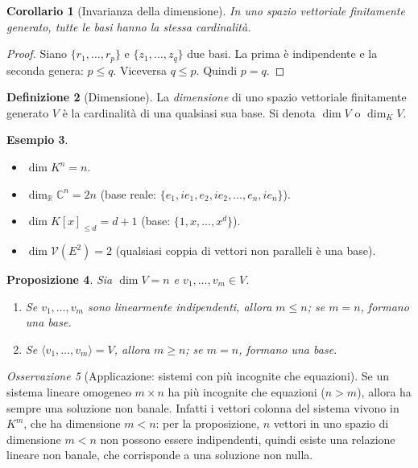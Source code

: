\documentclass[11pt, a4paper]{book}
\theoremstyle{definition}
\newtheorem{definizione}{Definizione}[section]
\newtheorem{esempio}[definizione]{Esempio}
\theoremstyle{plain}
\newtheorem{proposizione}[definizione]{Proposizione}
\newtheorem{corollario}[definizione]{Corollario}
\theoremstyle{remark}
\newtheorem{osservazione}[definizione]{Osservazione}
\newcommand{\R}{\mathbb{R}}
\newcommand{\C}{\mathbb{C}}
\begin{document}
\begin{corollario}[Invarianza della dimensione]
In uno spazio vettoriale finitamente generato, tutte le basi hanno la stessa cardinalità.
\end{corollario}

\begin{proof}
Siano $\{r_1,\ldots,r_p\}$ e $\{z_1,\ldots,z_q\}$ due basi. La prima è indipendente e la seconda genera: $p \leq q$. Viceversa $q \leq p$. Quindi $p = q$.
\end{proof}

\begin{defbox}
\begin{definizione}[Dimensione]
La \emph{dimensione} di uno spazio vettoriale finitamente generato $V$ è la cardinalità di una qualsiasi sua base. Si denota $\dim V$ o $\dim_K V$.
\end{definizione}
\end{defbox}

\begin{exbox}
\begin{esempio}
\begin{itemize}
  \item $\dim K^n = n$.
  \item $\dim_\R \C^n = 2n$ (base reale: $\{e_1, ie_1, e_2, ie_2, \ldots, e_n, ie_n\}$).
  \item $\dim K[x]_{\leq d} = d+1$ (base: $\{1, x, \ldots, x^d\}$).
  \item $\dim \mathcal{V}(E^2) = 2$ (qualsiasi coppia di vettori non paralleli è una base).
\end{itemize}
\end{esempio}
\end{exbox}

\begin{proposizione}
Sia $\dim V = n$ e $v_1, \ldots, v_m \in V$.
\begin{enumerate}
  \item Se $v_1,\ldots,v_m$ sono linearmente indipendenti, allora $m \leq n$; se $m = n$, formano una base.
  \item Se $\langle v_1,\ldots,v_m\rangle = V$, allora $m \geq n$; se $m = n$, formano una base.
\end{enumerate}
\end{proposizione}

\begin{osservazione}[Applicazione: sistemi con più incognite che equazioni]
Se un sistema lineare omogeneo $m \times n$ ha più incognite che equazioni ($n > m$), allora ha sempre una soluzione non banale. Infatti i vettori colonna del sistema vivono in $K^m$, che ha dimensione $m < n$: per la proposizione, $n$ vettori in uno spazio di dimensione $m < n$ non possono essere indipendenti, quindi esiste una relazione lineare non banale, che corrisponde a una soluzione non nulla.
\end{osservazione}
\end{document}
